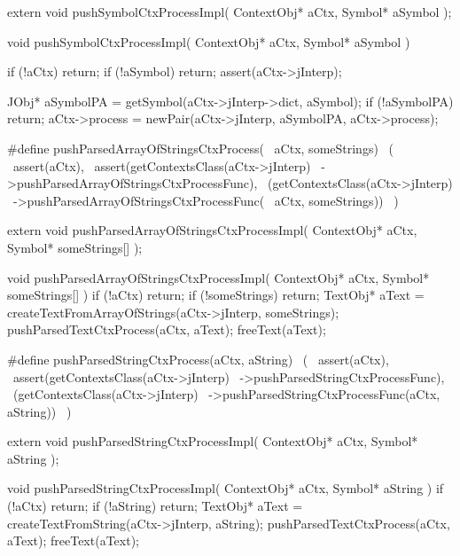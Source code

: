 \startCHeader
extern void pushSymbolCtxProcessImpl(
  ContextObj* aCtx,
  Symbol* aSymbol
);
\stopCHeader
{}

\startCCode
void pushSymbolCtxProcessImpl(
  ContextObj* aCtx,
  Symbol* aSymbol
) {
  if (!aCtx) return;
  if (!aSymbol) return;
  assert(aCtx->jInterp);

  JObj* aSymbolPA =
    getSymbol(aCtx->jInterp->dict, aSymbol);
  if (!aSymbolPA) return;
  aCtx->process = newPair(aCtx->jInterp, aSymbolPA, aCtx->process);
}
\stopCCode

\startCHeader
#define pushParsedArrayOfStringsCtxProcess(      \
  aCtx, someStrings)                             \
  (                                              \
    assert(aCtx),                                \
    assert(getContextsClass(aCtx->jInterp)       \
      ->pushParsedArrayOfStringsCtxProcessFunc), \
    (getContextsClass(aCtx->jInterp)             \
      ->pushParsedArrayOfStringsCtxProcessFunc(  \
        aCtx, someStrings))                      \
  )
\stopCHeader

\setCHeaderStream{private}
\startCHeader
extern void pushParsedArrayOfStringsCtxProcessImpl(
  ContextObj* aCtx,
  Symbol* someStrings[]
);
\stopCHeader
{}

\startCCode
void pushParsedArrayOfStringsCtxProcessImpl(
  ContextObj* aCtx,
  Symbol* someStrings[]
) {
  if (!aCtx) return;
  if (!someStrings) return;
  TextObj* aText =
    createTextFromArrayOfStrings(aCtx->jInterp, someStrings);
  pushParsedTextCtxProcess(aCtx, aText);
  freeText(aText);
}
\stopCCode

\startCHeader
#define pushParsedStringCtxProcess(aCtx, aString)      \
  (                                                    \
    assert(aCtx),                                      \
    assert(getContextsClass(aCtx->jInterp)             \
      ->pushParsedStringCtxProcessFunc),               \
    (getContextsClass(aCtx->jInterp)                   \
      ->pushParsedStringCtxProcessFunc(aCtx, aString)) \
  )
\stopCHeader

\setCHeaderStream{private}
\startCHeader
extern void pushParsedStringCtxProcessImpl(
  ContextObj* aCtx,
  Symbol* aString
);
\stopCHeader
\setCHeaderStream{public}

\startCCode
void pushParsedStringCtxProcessImpl(
  ContextObj* aCtx,
  Symbol* aString
) {
  if (!aCtx) return;
  if (!aString) return;
  TextObj* aText =
    createTextFromString(aCtx->jInterp, aString);
  pushParsedTextCtxProcess(aCtx, aText);
  freeText(aText);
}
\stopCCode


